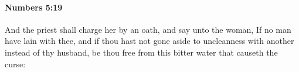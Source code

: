 
		\paragraph{Numbers 5:19} %
			\label{NUMBERS-5-19}

			And the priest shall charge her by an oath, and say unto the woman, If no man have lain with thee, and if thou hast not gone aside to uncleanness with another instead of thy husband, be thou free from this bitter water that causeth the curse:


